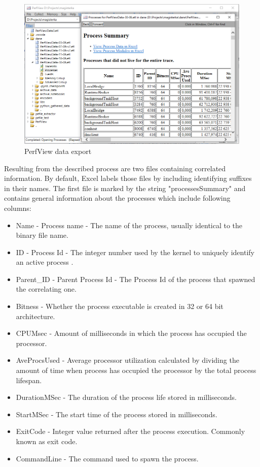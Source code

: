 \documentclass[a4paper,twoside,12pt]{book}
\begin{document}
\begin{figure}
	\centering
	\includegraphics[scale=0.55]{images/perf_export}
	\caption{PerfView data export}
	\label{fig:PerfViewexport}
 \end{figure}

Resulting from the described process are two files containing correlated information. By 
default, Excel labels those files by including identifying suffixes in their names. The 
first file is marked by the string "processesSummary" and contains general information 
about the processes which include following columns:
\begin{itemize}
	\item Name - Process name - The name of the process, usually identical to the binary 
	file name.
	\item ID - Process Id - The integer number used by the kernel to uniquely identify 
	an active process \cite{bib:MicrosoftWinInternals}.
	\item Parent\_ID - Parent Process Id - The Process Id of the process that spawned the 
	correlating one.
	\item Bitness - Whether the process executable is created in 32 or 64 bit architecture.
	\item CPUMsec - Amount of milliseconds in which the process has occupied the processor. 
	\item AveProcsUsed - Average processor utilization calculated by dividing the amount
	of time when process has occupied the processor by the total process lifespan. 
	\item DurationMSec - The duration of the process life stored in milliseconds.
	\item StartMSec - The start time of the process stored in milliseconds.
	\item ExitCode - Integer value returned after the process execution. Commonly known as 
	exit code.
	\item CommandLine - The command used to spawn the process.
\end{itemize}
\end{document}
